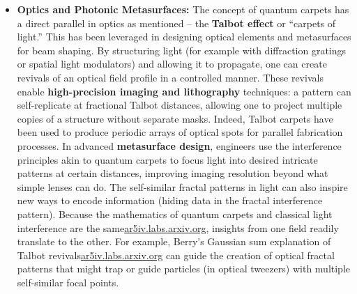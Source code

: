 \documentclass[11pt,a4paper]{article}
\begin{document}
\begin{itemize}
  \item \textbf{Optics and Photonic Metasurfaces:} The concept of quantum carpets has a direct parallel in optics as mentioned – the \textbf{Talbot effect} or “carpets of light.” This has been leveraged in designing optical elements and metasurfaces for beam shaping. By structuring light (for example with diffraction gratings or spatial light modulators) and allowing it to propagate, one can create revivals of an optical field profile in a controlled manner. These revivals enable \textbf{high-precision imaging and lithography} techniques: a pattern can self-replicate at fractional Talbot distances, allowing one to project multiple copies of a structure without separate masks. Indeed, Talbot carpets have been used to produce periodic arrays of optical spots for parallel fabrication processes. In advanced \textbf{metasurface design}, engineers use the interference principles akin to quantum carpets to focus light into desired intricate patterns at certain distances, improving imaging resolution beyond what simple lenses can do. The self-similar fractal patterns in light can also inspire new ways to encode information (hiding data in the fractal interference pattern). Because the mathematics of quantum carpets and classical light interference are the same\href{https://ar5iv.labs.arxiv.org/html/1808.09708#:~:text=In fact%2C the same phenomenon,the help of Gaussian sum}{ar5iv.labs.arxiv.org}, insights from one field readily translate to the other. For example, Berry’s Gaussian sum explanation of Talbot revivals\href{https://ar5iv.labs.arxiv.org/html/1808.09708#:~:text=In fact%2C the same phenomenon,the help of Gaussian sum}{ar5iv.labs.arxiv.org} can guide the creation of optical fractal patterns that might trap or guide particles (in optical tweezers) with multiple self-similar focal points.

\end{itemize}
\end{document}
